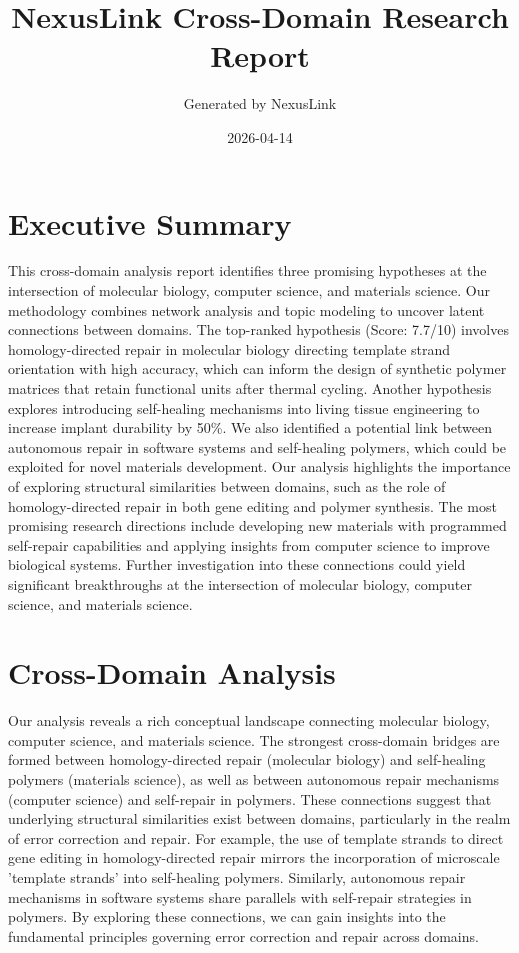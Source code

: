 \documentclass[12pt,a4paper]{article}
\title{NexusLink Cross-Domain Research Report}
\author{Generated by NexusLink}
\date{2026-04-14}
\begin{document}
\maketitle
\tableofcontents
\newpage

\section{Executive Summary}

This cross-domain analysis report identifies three promising hypotheses at the intersection of molecular biology, computer science, and materials science. Our methodology combines network analysis and topic modeling to uncover latent connections between domains. The top-ranked hypothesis (Score: 7.7/10) involves homology-directed repair in molecular biology directing template strand orientation with high accuracy, which can inform the design of synthetic polymer matrices that retain functional units after thermal cycling. Another hypothesis explores introducing self-healing mechanisms into living tissue engineering to increase implant durability by 50\%. We also identified a potential link between autonomous repair in software systems and self-healing polymers, which could be exploited for novel materials development. Our analysis highlights the importance of exploring structural similarities between domains, such as the role of homology-directed repair in both gene editing and polymer synthesis. The most promising research directions include developing new materials with programmed self-repair capabilities and applying insights from computer science to improve biological systems. Further investigation into these connections could yield significant breakthroughs at the intersection of molecular biology, computer science, and materials science.

\section{Cross-Domain Analysis}

Our analysis reveals a rich conceptual landscape connecting molecular biology, computer science, and materials science. The strongest cross-domain bridges are formed between homology-directed repair (molecular biology) and self-healing polymers (materials science), as well as between autonomous repair mechanisms (computer science) and self-repair in polymers. These connections suggest that underlying structural similarities exist between domains, particularly in the realm of error correction and repair. For example, the use of template strands to direct gene editing in homology-directed repair mirrors the incorporation of microscale 'template strands' into self-healing polymers. Similarly, autonomous repair mechanisms in software systems share parallels with self-repair strategies in polymers. By exploring these connections, we can gain insights into the fundamental principles governing error correction and repair across domains.
\end{document}
